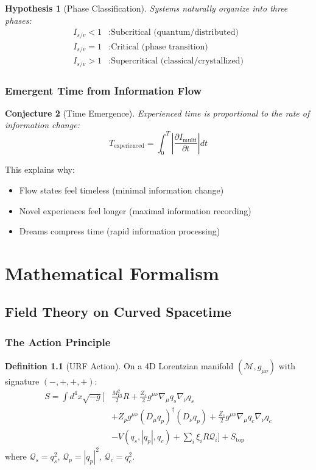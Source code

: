 \documentclass[openany]{memoir}
\theoremstyle{definition}
\newtheorem{definition}{Definition}[chapter]
\theoremstyle{plain}
\newtheorem{conjecture}[definition]{Conjecture}
\newtheorem{hypothesis}[definition]{Hypothesis}
\theoremstyle{remark}
\newcommand{\Imulti}{I_{\text{multi}}}
\newcommand{\Isv}{I_{s/v}}
\newcommand{\MPl}{M_{\text{Pl}}}
\begin{document}
\begin{hypothesis}[Phase Classification]
Systems naturally organize into three phases:
\begin{align}
\Isv < 1 &: \text{Subcritical (quantum/distributed)} \\
\Isv = 1 &: \text{Critical (phase transition)} \\
\Isv > 1 &: \text{Supercritical (classical/crystallized)}
\end{align}
\end{hypothesis}

\section{Emergent Time from Information Flow}

\begin{conjecture}[Time Emergence]
Experienced time is proportional to the rate of information change:
\begin{equation}
T_{\text{experienced}} = \int_0^T \left|\frac{\partial \Imulti}{\partial t}\right| dt
\end{equation}
\end{conjecture}

This explains why:
\begin{itemize}
\item Flow states feel timeless (minimal information change)
\item Novel experiences feel longer (maximal information recording)
\item Dreams compress time (rapid information processing)
\end{itemize}

\part{Mathematical Formalism}

\chapter{Field Theory on Curved Spacetime}

\section{The Action Principle}

\begin{definition}[URF Action]
On a 4D Lorentzian manifold $(\mathcal{M}, g_{\mu\nu})$ with signature $(-,+,+,+)$:
\begin{align}
S = \int d^4x\sqrt{-g}\bigg[&\frac{\MPl^2}{2}R + \frac{Z_s}{2}g^{\mu\nu}\nabla_\mu q_s \nabla_\nu q_s \nonumber\\
&+ Z_p g^{\mu\nu}(D_\mu q_p)^\dagger(D_\nu q_p) + \frac{Z_c}{2}g^{\mu\nu}\nabla_\mu q_c \nabla_\nu q_c \nonumber\\
&- V(q_s, |q_p|, q_c) + \sum_i \xi_i R \mathcal{Q}_i\bigg] + S_{\text{top}}
\end{align}
where $\mathcal{Q}_s = q_s^2$, $\mathcal{Q}_p = |q_p|^2$, $\mathcal{Q}_c = q_c^2$.
\end{definition}
\end{document}
